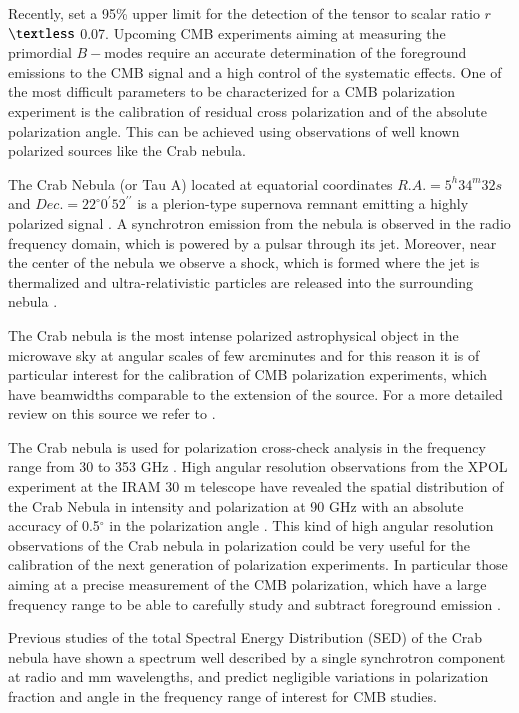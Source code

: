 \documentclass[twocolumn,traditabstract]{aa}
\begin{document}
Recently, \citet{bicepplanck2015,bicep2016} set a 95\% upper limit for the detection of the tensor to scalar ratio $r$ $\textless$ 0.07.
Upcoming CMB experiments aiming at measuring the primordial $B-$modes require an accurate determination of the foreground emissions to the CMB signal and a high control of the systematic effects. One of the most difficult parameters to be characterized for a CMB polarization experiment is the calibration of residual cross polarization and of the absolute polarization angle. This can be achieved using observations of well known polarized sources like the Crab nebula.

The Crab Nebula (or Tau A) located at equatorial coordinates $R.A. = 5^h34^m32s$ and $Dec. = 22^{\circ}0^{\prime}52^{\prime\prime}$ is a plerion-type supernova remnant emitting a highly polarized signal \citep{1978A&A....70..419W,1991ApJ...368..463M}.
A synchrotron emission from the nebula is observed in the radio frequency domain, which is powered by a pulsar through its jet. 
Moreover, near the center of the nebula we observe a shock, which is formed where the jet is thermalized and ultra-relativistic particles are released into the surrounding nebula \citep{2000ApJ...536L..81W,2011A&A...528A..11W}. 

The Crab nebula is the most intense polarized astrophysical object in the microwave sky at angular scales of few arcminutes and for this reason it is of particular interest  for the calibration of CMB polarization experiments, which have beamwidths comparable to the extension of the source.
For a more detailed review on this source we refer to \citet{2008ARA&A..46..127H}.

The Crab nebula is used for polarization cross-check analysis in the frequency range from 30 to 353 GHz \citep{2011ApJS..192...19W,2015arXiv150702058P}. High angular resolution observations from the XPOL experiment \citep{thum2008} at the IRAM 30 m telescope have revealed the spatial distribution of the Crab Nebula in intensity and polarization at 90 GHz with an absolute accuracy of 0.5$^{\circ}$ in the polarization angle \citep{aumont2010}. 
This kind of high angular resolution observations of the Crab nebula in polarization could be very useful for the calibration of the next generation of polarization experiments. In particular those aiming at a precise measurement of the CMB polarization, which have a large frequency range to be able to carefully study and subtract foreground emission \citep{2016IJMPD..2540008K}. 

Previous studies \citep{macias2010} of the total Spectral Energy Distribution (SED) of the Crab nebula have shown a spectrum well described by a single synchrotron component at radio and mm wavelengths, and predict negligible variations in polarization fraction and angle in the frequency range of interest for CMB studies.
 
\end{document}
